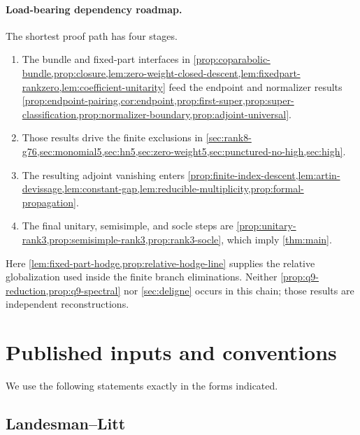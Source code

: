 \documentclass[11pt]{article}
\theoremstyle{definition}
\begin{document}
\paragraph{Load-bearing dependency roadmap.}
The shortest proof path has four stages.
\begin{enumerate}[label=\textup{R\arabic*.},leftmargin=*]
\item The bundle and fixed-part interfaces in
\cref{prop:coparabolic-bundle,prop:closure,lem:zero-weight-closed-descent,lem:fixedpart-rankzero,lem:coefficient-unitarity}
feed the endpoint and normalizer results
\cref{prop:endpoint-pairing,cor:endpoint,prop:first-super,prop:super-classification,prop:normalizer-boundary,prop:adjoint-universal}.
\item Those results drive the finite exclusions in
\cref{sec:rank8-g76,sec:monomial5,sec:hn5,sec:zero-weight5,sec:punctured-no-high,sec:high}.
\item The resulting adjoint vanishing enters
\cref{prop:finite-index-descent,lem:artin-devissage,lem:constant-gap,lem:reducible-multiplicity,prop:formal-propagation}.
\item The final unitary, semisimple, and socle steps are
\cref{prop:unitary-rank3,prop:semisimple-rank3,prop:rank3-socle}, which imply
\cref{thm:main}.
\end{enumerate}
Here \cref{lem:fixed-part-hodge,prop:relative-hodge-line} supplies the
relative globalization used inside the finite branch eliminations.  Neither
\cref{prop:q9-reduction,prop:q9-spectral} nor \cref{sec:deligne} occurs in
this chain; those results are independent reconstructions.

\section{Published inputs and conventions}\label{sec:dependencies}

We use the following statements exactly in the forms indicated.

\subsection{Landesman--Litt}
\end{document}
